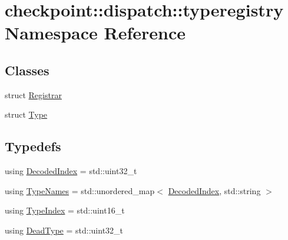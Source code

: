 \hypertarget{namespacecheckpoint_1_1dispatch_1_1typeregistry}{}\section{checkpoint\+:\+:dispatch\+:\+:typeregistry Namespace Reference}
\label{namespacecheckpoint_1_1dispatch_1_1typeregistry}
\subsection*{Classes}
\begin{DoxyCompactItemize}
\item 
struct \hyperlink{structcheckpoint_1_1dispatch_1_1typeregistry_1_1_registrar}{Registrar}
\item 
struct \hyperlink{structcheckpoint_1_1dispatch_1_1typeregistry_1_1_type}{Type}
\end{DoxyCompactItemize}
\subsection*{Typedefs}
\begin{DoxyCompactItemize}
\item 
using \hyperlink{namespacecheckpoint_1_1dispatch_1_1typeregistry_a3d1f57de0a997a245eb9e1db07b94140}{Decoded\+Index} = std\+::uint32\+\_\+t
\item 
using \hyperlink{namespacecheckpoint_1_1dispatch_1_1typeregistry_ae6cc6f19ecb8f66f73fa14a1acdc9b6e}{Type\+Names} = std\+::unordered\+\_\+map$<$ \hyperlink{namespacecheckpoint_1_1dispatch_1_1typeregistry_a3d1f57de0a997a245eb9e1db07b94140}{Decoded\+Index}, std\+::string $>$
\item 
using \hyperlink{namespacecheckpoint_1_1dispatch_1_1typeregistry_a40b8b0de7b59181c6b3d8f2657280467}{Type\+Index} = std\+::uint16\+\_\+t
\item 
using \hyperlink{namespacecheckpoint_1_1dispatch_1_1typeregistry_ad37ee8c21a6bdfc7b6826843631af922}{Dead\+Type} = std\+::uint32\+\_\+t
\end{DoxyCompactItemize}
